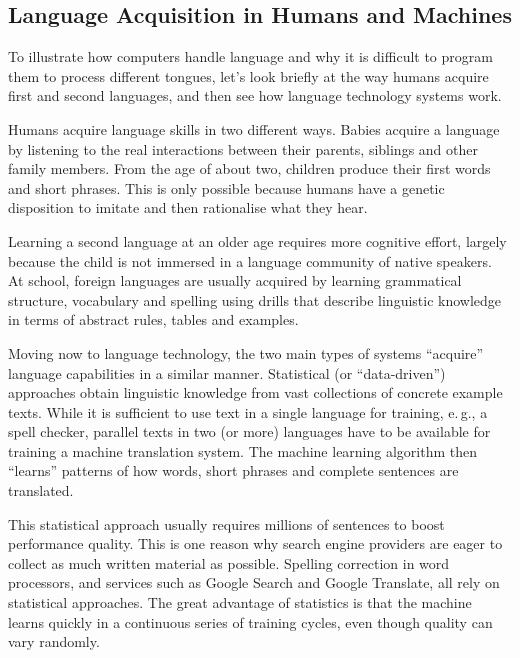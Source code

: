 \begin{multicols}{2}
\subsection{Language Acquisition in Humans and Machines}

To illustrate how computers handle language and why it is difficult to program them to process different tongues, let’s look briefly at the way humans acquire first and second languages, and then see how language technology systems work.

Humans acquire language skills in two different ways. Babies acquire a language by listening to the real interactions between their parents, siblings and other family members. From the age of about two, children produce their first words and short phrases. This is only possible because humans have a genetic disposition to imitate and then rationalise what they hear. 

Learning a second language at an older age requires more cognitive effort, largely because the child is not immersed in a language community of native speakers. At school, foreign languages are usually acquired by learning grammatical structure, vocabulary and spelling using drills that describe linguistic knowledge in terms of abstract rules, tables and examples.


Moving now to language technology, the two main types of systems
``acquire'' language capabilities in a similar manner. Statistical (or
``data-driven'') approaches obtain linguistic knowledge from vast
collections of concrete example texts. While it is sufficient to use
text in a single language for training, e.\,g., a spell checker,
parallel texts in two (or more) languages have to be available for
training a machine translation system. The machine learning algorithm
then “learns” patterns of how words, short phrases and complete
sentences are translated.

This statistical approach usually requires millions of sentences to boost performance quality. This is one reason why search engine providers are eager to collect as much written material as possible. Spelling correction in word processors, and services such as Google Search and Google Translate, all rely on statistical approaches. The great advantage of statistics is that the machine learns quickly in a continuous series of training cycles, even though quality can vary randomly.


\end{multicols}
